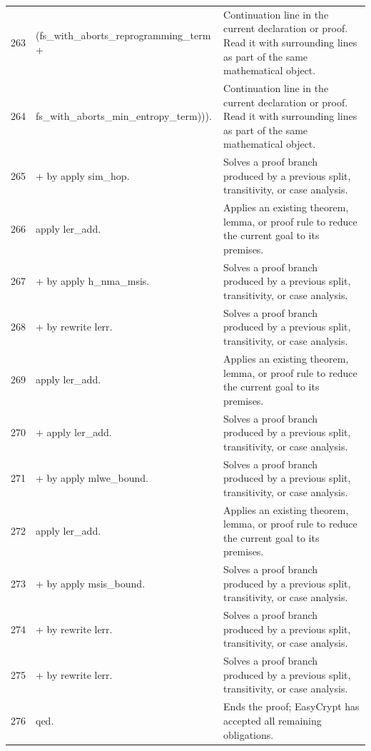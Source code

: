 \documentclass[10pt]{article}
\begin{document}
\begin{longtable}{r L{0.53\textwidth} L{0.37\textwidth}}
263 & {\ttfamily\scriptsize       (fs\_with\_aborts\_reprogramming\_term +} & Continuation line in the current declaration or proof.  Read it with surrounding lines as part of the same mathematical object. \\
264 & {\ttfamily\scriptsize         fs\_with\_aborts\_min\_entropy\_term))).} & Continuation line in the current declaration or proof.  Read it with surrounding lines as part of the same mathematical object. \\
265 & {\ttfamily\scriptsize   + by apply sim\_hop.} & Solves a proof branch produced by a previous split, transitivity, or case analysis. \\
266 & {\ttfamily\scriptsize   apply ler\_add.} & Applies an existing theorem, lemma, or proof rule to reduce the current goal to its premises. \\
267 & {\ttfamily\scriptsize   + by apply h\_nma\_msis.} & Solves a proof branch produced by a previous split, transitivity, or case analysis. \\
268 & {\ttfamily\scriptsize   + by rewrite lerr.} & Solves a proof branch produced by a previous split, transitivity, or case analysis. \\
269 & {\ttfamily\scriptsize apply ler\_add.} & Applies an existing theorem, lemma, or proof rule to reduce the current goal to its premises. \\
270 & {\ttfamily\scriptsize + apply ler\_add.} & Solves a proof branch produced by a previous split, transitivity, or case analysis. \\
271 & {\ttfamily\scriptsize   + by apply mlwe\_bound.} & Solves a proof branch produced by a previous split, transitivity, or case analysis. \\
272 & {\ttfamily\scriptsize   apply ler\_add.} & Applies an existing theorem, lemma, or proof rule to reduce the current goal to its premises. \\
273 & {\ttfamily\scriptsize   + by apply msis\_bound.} & Solves a proof branch produced by a previous split, transitivity, or case analysis. \\
274 & {\ttfamily\scriptsize   + by rewrite lerr.} & Solves a proof branch produced by a previous split, transitivity, or case analysis. \\
275 & {\ttfamily\scriptsize + by rewrite lerr.} & Solves a proof branch produced by a previous split, transitivity, or case analysis. \\
276 & {\ttfamily\scriptsize qed.} & Ends the proof; EasyCrypt has accepted all remaining obligations. \\

\end{longtable}
\end{document}
